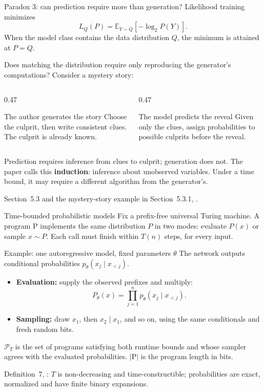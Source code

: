 \documentclass[aspectratio=169,notheorems]{beamer}
\theoremstyle{definition}
\newcommand{\E}{\mathbb{E}}
\newcommand{\PT}{\mathcal{P}_T}
\newcommand{\prog}{\mathrm{P}}
\newcommand{\src}[1]{{\scriptsize\color{black!60}#1\par}}
\begin{document}
\begin{frame}{Paradox 3: can prediction require more than generation?}
\small
Likelihood training minimizes
\[
L_Q(P)=\E_{Y\sim Q}[-\log_2 P(Y)].
\]
When the model class contains the data distribution $Q$, the minimum is attained at $P=Q$.

\medskip
Does matching the distribution require only reproducing the generator's computations? Consider a mystery story:

\begin{columns}[T]
\begin{column}{0.47\textwidth}
\begin{block}{The author generates the story}
Choose the culprit, then write consistent clues. The culprit is already known.
\end{block}
\end{column}
\begin{column}{0.47\textwidth}
\begin{block}{The model predicts the reveal}
Given only the clues, assign probabilities to possible culprits before the reveal.
\end{block}
\end{column}
\end{columns}
\medskip
Prediction requires inference from clues to culprit; generation does not. The paper calls this \textbf{induction}: inference about unobserved variables. Under a time bound, it may require a different algorithm from the generator's.
\par\smallskip
\src{Section~5.3 and the mystery-story example in Section~5.3.1, \citet{finzi2026}.}
\end{frame}
\begin{frame}{Time-bounded probabilistic models}
\small
Fix a prefix-free universal Turing machine. A program $\prog$ implements the same distribution $P$ in two modes: evaluate $P(x)$ or sample $x\sim P$. Each call must finish within $T(n)$ steps, for every input.

\begin{block}{Example: one autoregressive model, fixed parameters $\theta$}
The network outputs conditional probabilities $p_\theta(x_j\mid x_{<j})$.
\begin{itemize}\setlength{\itemsep}{0.5em}
\item \textbf{Evaluation:} supply the observed prefixes and multiply:
\[
P_\theta(x)=\prod_{j=1}^{n}p_\theta(x_j\mid x_{<j}).
\]
\item \textbf{Sampling:} draw $x_1$, then $x_2\mid x_1$, and so on, using the same conditionals and fresh random bits.
\end{itemize}
\end{block}
$\PT$ is the set of programs satisfying both runtime bounds and whose sampler agrees with the evaluated probabilities. $|\prog|$ is the program length in bits.
\par\smallskip
\src{Definition~7, \citet{finzi2026}: $T$ is non-decreasing and time-constructible; probabilities are exact, normalized and have finite binary expansions.}
\end{frame}
\end{document}
